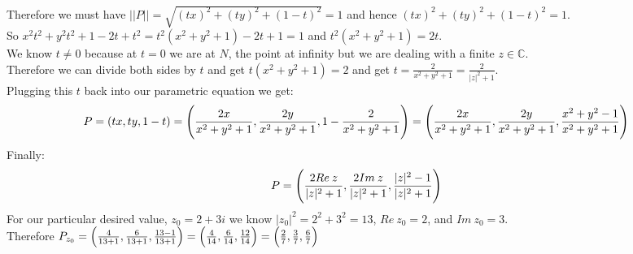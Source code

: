 \documentclass{article}
\begin{document}
\begin{center}
    \\Therefore we must have $||P|| = \sqrt{(tx)^2 + (ty)^2 + (1 - t)^2} = 1$ and hence $(tx)^2 + (ty)^2 + (1 - t)^2 = 1$.
    \\So $x^2 t^2 + y^2 t^2 + 1 - 2t + t^2 = t^2 (x^2 + y^2 + 1) - 2t + 1 = 1$ and $t^2 (x^2 + y^2 + 1) = 2t$.
    \\We know $t\neq 0$ because at $t = 0$ we are at $N$, the point at infinity but we are dealing with a finite $z\in\mathbb{C}$.
    \\Therefore we can divide both sides by $t$ and get $t(x^2 + y^2 + 1) = 2$ and get $t =\frac{2}{x^2 + y^2 + 1} =\frac{2}{|z|^2 + 1}$.
    \\Plugging this $t$ back into our parametric equation we get:
    \[P = (tx, ty, 1 - t) = \Bigg{(}\frac{2x}{x^2 + y^2 + 1},\frac{2y}{x^2 + y^2 + 1}, 1 -\frac{2}{x^2 + y^2 + 1}\Bigg{)} =\Bigg{(}\frac{2x}{x^2 + y^2 + 1},\frac{2y}{x^2 + y^2 + 1},\frac{x^2 + y^2 - 1}{x^2 + y^2 + 1}\Bigg{)}\]
    Finally:
    \[P = \Bigg{(}\frac{2 Re\:z}{|z|^2 + 1},\frac{2 Im\:z}{|z|^2 + 1},\frac{|z|^2 - 1}{|z|^2 + 1}\Bigg{)}\]
    For our particular desired value, $z_0 = 2 + 3i$ we know $|z_0|^2 = 2^2 + 3^2 = 13$, $Re\:z_0 = 2$, and $Im\:z_0 = 3$.
    \\Therefore $P_{z_0} =\Big{(}\frac{4}{13 + 1},\frac{6}{13 + 1},\frac{13 - 1}{13 + 1}\Big{)} =\Big{(}\frac{4}{14},\frac{6}{14},\frac{12}{14}\Big{)} =\Big{(}\frac{2}{7},\frac{3}{7},\frac{6}{7}\Big{)}$ \qedsymbol
\end{center}
\end{document}
